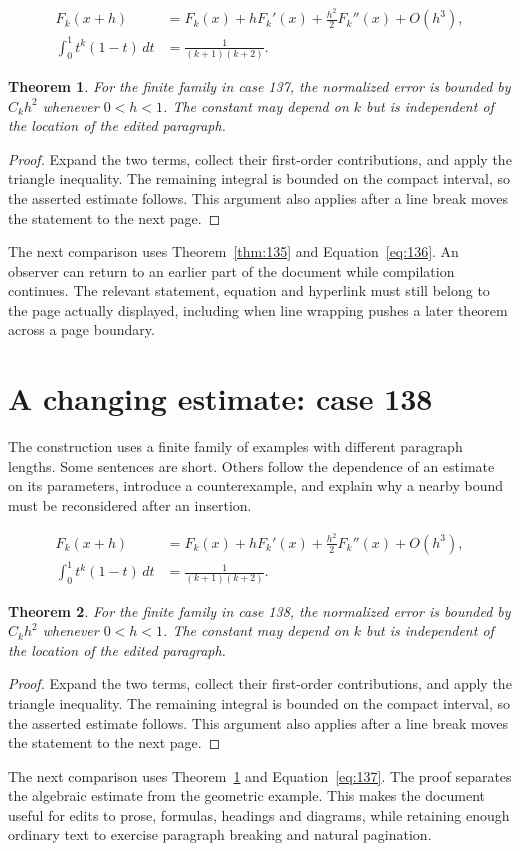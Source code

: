 \documentclass[a4paper,10pt]{article}
\newtheorem{theorem}{Theorem}[section]
\begin{document}
\lipsum[19-20]
\begin{align}\label{eq:136}
 F_k(x+h)&=F_k(x)+hF_k'(x)+\frac{h^2}{2}F_k''(x)+O(h^3),\\
 \int_0^1 t^k(1-t)\,dt&=\frac{1}{(k+1)(k+2)}.
\end{align}
\begin{theorem}\label{thm:136}
For the finite family in case 137, the normalized error is bounded by $C_k h^2$ whenever $0<h<1$. The constant may depend on $k$ but is independent of the location of the edited paragraph.
\end{theorem}
\begin{proof}
Expand the two terms, collect their first-order contributions, and apply the
triangle inequality. The remaining integral is bounded on the compact interval,
so the asserted estimate follows. This argument also applies after a line break
moves the statement to the next page.
\end{proof}
The next comparison uses Theorem~\ref{thm:135} and Equation~\ref{eq:136}. An observer can return to an earlier part of the document while compilation continues. The relevant statement, equation and hyperlink must still belong to the page actually displayed, including when line wrapping pushes a later theorem across a page boundary.

\lipsum[8]

\section{A changing estimate: case 138}\label{unit:137}
The construction uses a finite family of examples with different paragraph lengths. Some sentences are short. Others follow the dependence of an estimate on its parameters, introduce a counterexample, and explain why a nearby bound must be reconsidered after an insertion.

\lipsum[22-23]
\begin{align}\label{eq:137}
 F_k(x+h)&=F_k(x)+hF_k'(x)+\frac{h^2}{2}F_k''(x)+O(h^3),\\
 \int_0^1 t^k(1-t)\,dt&=\frac{1}{(k+1)(k+2)}.
\end{align}
\begin{theorem}\label{thm:137}
For the finite family in case 138, the normalized error is bounded by $C_k h^2$ whenever $0<h<1$. The constant may depend on $k$ but is independent of the location of the edited paragraph.
\end{theorem}
\begin{proof}
Expand the two terms, collect their first-order contributions, and apply the
triangle inequality. The remaining integral is bounded on the compact interval,
so the asserted estimate follows. This argument also applies after a line break
moves the statement to the next page.
\end{proof}
The next comparison uses Theorem~\ref{thm:136} and Equation~\ref{eq:137}. The proof separates the algebraic estimate from the geometric example. This makes the document useful for edits to prose, formulas, headings and diagrams, while retaining enough ordinary text to exercise paragraph breaking and natural pagination.
\end{document}
